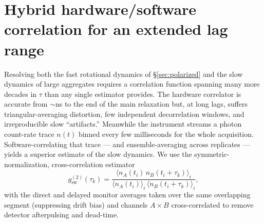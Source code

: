 \documentclass[11pt]{article}
\newcommand{\g}[1]{g^{(#1)}}
\begin{document}
\section{Hybrid hardware/software correlation for an extended lag range}
\label{sec:hybrid}
Resolving both the fast rotational dynamics of \S\ref{sec:polarized} and the
slow dynamics of large aggregates requires a correlation function spanning many
more decades in $\tau$ than any single estimator provides. The hardware
correlator is accurate from $\sim$ns to the end of the main relaxation but, at
long lags, suffers triangular-averaging distortion, few independent
decorrelation windows, and irreproducible slow ``artifacts.'' Meanwhile the
instrument streams a photon count-rate trace $n(t)$ binned every few
milliseconds for the whole acquisition. Software-correlating that trace --- and
ensemble-averaging across replicates --- yields a superior estimate of the slow
dynamics. We use the symmetric-normalization, cross-correlation estimator
\begin{equation}\label{eq:soft_corr}
  \g2_{\mathrm{sw}}(\tau_k) =
  \frac{\bigl\langle n_A(t_i)\,n_B(t_i+\tau_k)\bigr\rangle_i}
       {\bigl\langle n_A(t_i)\bigr\rangle_i\,\bigl\langle n_B(t_i+\tau_k)\bigr\rangle_i},
\end{equation}
with the direct and delayed monitor averages taken over the same overlapping
segment (suppressing drift bias) and channels $A\times B$ cross-correlated to
remove detector afterpulsing and dead-time.
\end{document}
